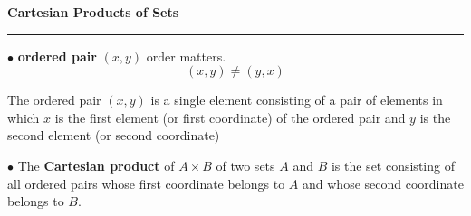 {\bf Cartesian Products of Sets}
\hrule
\vskip 6pt

$\bullet$ {\bf ordered pair} $(x,y)$ order matters. $$(x,y)\neq (y,x)$$

The ordered pair $(x,y)$ is a single element consisting of a pair of elements in which $x$ is the first element (or first coordinate) of the ordered pair and $y$ is the second element (or second coordinate)
\vskip 1pc

$\bullet$ The {\bf Cartesian product} of $A\times B$  of two sets $A$ and $B$ is the set consisting of all ordered pairs whose first coordinate belongs to $A$ and whose second coordinate belongs to $B$.

\vfill\eject
